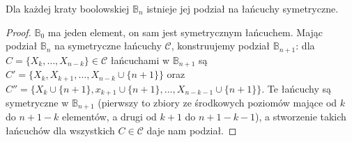 \begin{theorem}
	Dla każdej kraty boolowskiej $\mathbb B_n$ istnieje jej podział na łańcuchy symetryczne.
\end{theorem}
\begin{proof}
	$\mathbb B_0$ ma jeden element, on sam jest symetrycznym łańcuchem. Mając
	podział $\mathbb B_n$ na symetryczne łańcuchy $\mathcal C$, konstruujemy
	podział $\mathbb B_{n+1}$: dla $C = \{X_k,\ldots, X_{n-k}\}\in\mathcal C$
	łańcuchami w $\mathbb B_{n+1}$ są $C' = \{X_k,X_{k+1},\ldots,
		X_{n-k}\cup\{n+1\}\}$ oraz $C'' = \{X_k\cup\{n+1\},
		x_{k+1}\cup\{n+1\},\ldots, X_{n-k-1}\cup\{n+1\}\}$. Te łańcuchy są symetryczne
	w $\mathbb B_{n+1}$ (pierwszy to zbiory ze środkowych poziomów mające od $k$
	do $n+1-k$ elementów, a drugi od $k+1$ do $n+1-k-1$), a stworzenie takich
	łańcuchów dla wszystkich $C\in\mathcal C$ daje nam podział.
\end{proof}


